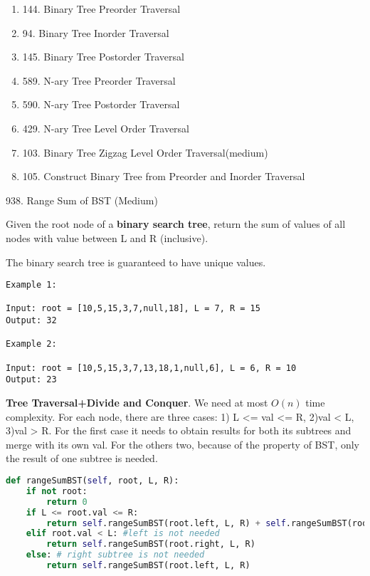 \documentclass[main.tex]{subfiles}
\begin{document}
\begin{enumerate}
    \item 144. Binary Tree Preorder Traversal
    \item 94. Binary Tree Inorder Traversal
    \item 145. Binary Tree Postorder Traversal
    \item 589. N-ary Tree Preorder Traversal
    \item 590. N-ary Tree Postorder Traversal
    \item 429. N-ary Tree Level Order Traversal
    \item 103. Binary Tree Zigzag Level Order Traversal(medium)
    \item 105. Construct Binary Tree from Preorder and Inorder Traversal
\end{enumerate}

938. Range Sum of BST (Medium)

Given the root node of a \textbf{binary search tree}, return the sum of values of all nodes with value between L and R (inclusive).

The binary search tree is guaranteed to have unique values.
\begin{lstlisting}
Example 1:

Input: root = [10,5,15,3,7,null,18], L = 7, R = 15
Output: 32

Example 2:

Input: root = [10,5,15,3,7,13,18,1,null,6], L = 6, R = 10
Output: 23
\end{lstlisting}
\textbf{Tree Traversal+Divide and Conquer}. We need at most $O(n)$ time complexity. For each node, there are three cases: 1) L <= val <= R, 2)val < L, 3)val > R. For the first case it needs to obtain results for both its subtrees and merge with its own val. For the others two, because of the property of BST, only the result of one subtree is needed. 
\begin{lstlisting}[language=Python]
def rangeSumBST(self, root, L, R):
    if not root:
        return 0
    if L <= root.val <= R:
        return self.rangeSumBST(root.left, L, R) + self.rangeSumBST(root.right, L, R) + root.val
    elif root.val < L: #left is not needed
        return self.rangeSumBST(root.right, L, R)
    else: # right subtree is not needed
        return self.rangeSumBST(root.left, L, R)
\end{lstlisting}
\end{document}
